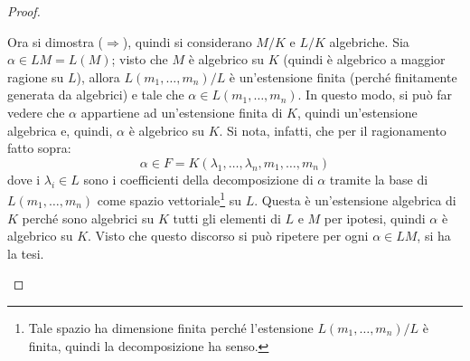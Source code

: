 \documentclass[12pt]{scrartcl}
\theoremstyle{style}
\numberwithin{equation}{subsection}
\begin{document}
\begin{proof}
\begin{enumerate}[(a).]
			Ora si dimostra ($\Rightarrow $), quindi si considerano $M / K$ e $L / K$ algebriche.
			Sia $\alpha  \in LM = L(M)$; visto che $M$ \`e algebrico su $K$ (quindi \`e algebrico a maggior ragione su $L$), allora $L(m_1,\ldots,m_n) / L$ \`e un'estensione finita (perch\'e finitamente generata da algebrici) e tale che $\alpha \in L(m_1,\ldots,m_n)$.
			In questo modo, si pu\`o far vedere che $\alpha $ appartiene ad un'estensione finita di $K$, quindi un'estensione algebrica e, quindi, $\alpha $ \`e algebrico su $K$.
			Si nota, infatti, che per il ragionamento fatto sopra:
			\[
			\alpha  \in  F = K(\lambda _1,\ldots,\lambda _n,m_1,\ldots,m_n)
			\] 
			dove i $\lambda _i\in L$ sono i coefficienti della decomposizione di $\alpha $ tramite la base di $L(m_1,\ldots,m_n)$ come spazio vettoriale\footnote{Tale spazio ha dimensione finita perch\'e l'estensione $L(m_1,\ldots,m_n) / L$ \`e finita, quindi la decomposizione ha senso.} su $L$. 
			Questa \`e un'estensione algebrica di $K$ perch\'e sono algebrici su $K$ tutti gli elementi di $L$ e $M$ per ipotesi, quindi $\alpha $ \`e algebrico su $K$.
			Visto che questo discorso si pu\`o ripetere per ogni $\alpha \in LM $, si ha la tesi.
		\end{enumerate}
	\end{proof}
\end{document}
